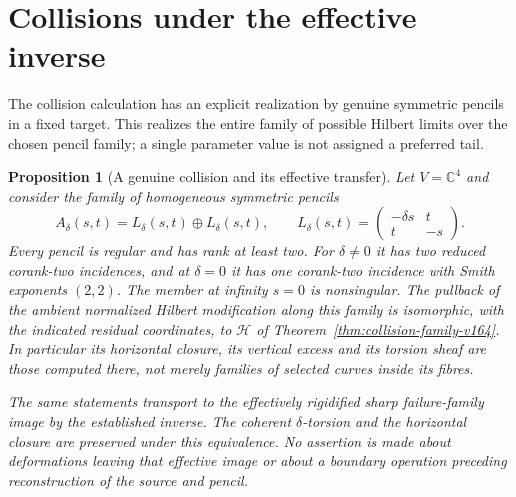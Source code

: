 \documentclass[11pt,reqno]{amsart}
\numberwithin{equation}{section}
\newtheorem{proposition}[theorem]{Proposition}
\theoremstyle{definition}\newtheorem{definition}[theorem]{Definition}
\theoremstyle{remark}\newtheorem{remark}[theorem]{Remark}
\newcommand{\C}{\mathbb C}\newcommand{\Q}{\mathbb Q}
\begin{document}
\section{Collisions under the effective inverse}
\label{sec:effective-collision-v164}
The collision calculation has an explicit realization by genuine
symmetric pencils in a fixed target. This realizes the entire family
of possible Hilbert limits over the chosen pencil family; a single
parameter value is not assigned a preferred tail.

\begin{proposition}[A genuine collision and its effective transfer]
\label{prop:genuine-collision-v164}
Let $V=\C^4$ and consider the family of homogeneous symmetric pencils
\begin{equation}\label{eq:genuine-collision-v164}
 A_\delta(s,t)=L_\delta(s,t)\oplus L_\delta(s,t),\qquad
 L_\delta(s,t)=
 \begin{pmatrix}-\delta s&t\\t&-s\end{pmatrix}.
\end{equation}
Every pencil is regular and has rank at least two. For $\delta\ne0$
it has two reduced corank-two incidences, and at $\delta=0$ it has
one corank-two incidence with Smith exponents $(2,2)$. The member
at infinity $s=0$ is nonsingular. The pullback of the ambient
normalized Hilbert modification along this family is isomorphic,
with the indicated residual coordinates, to $\mathcal H$ of
Theorem~\ref{thm:collision-family-v164}. In particular its horizontal
closure, its vertical excess and its torsion sheaf are those computed
there, not merely families of selected curves inside its fibres.

The same statements transport to the effectively rigidified sharp
failure-family image by the established inverse. The coherent
$\delta$-torsion and the horizontal closure are preserved under this
equivalence. No assertion is made about deformations leaving that
effective image or about a boundary operation preceding reconstruction
of the source and pencil.
\end{proposition}
\end{document}
